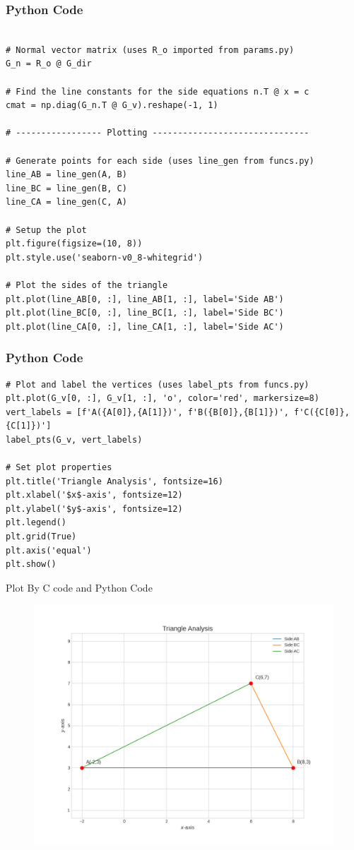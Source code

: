 \documentclass{beamer}
\begin{document}
\begin{frame}[fragile]
\frametitle{Python Code}
\begin{lstlisting}

# Normal vector matrix (uses R_o imported from params.py)
G_n = R_o @ G_dir

# Find the line constants for the side equations n.T @ x = c
cmat = np.diag(G_n.T @ G_v).reshape(-1, 1)

# ----------------- Plotting -------------------------------

# Generate points for each side (uses line_gen from funcs.py)
line_AB = line_gen(A, B)
line_BC = line_gen(B, C)
line_CA = line_gen(C, A)

# Setup the plot
plt.figure(figsize=(10, 8))
plt.style.use('seaborn-v0_8-whitegrid')

# Plot the sides of the triangle
plt.plot(line_AB[0, :], line_AB[1, :], label='Side AB')
plt.plot(line_BC[0, :], line_BC[1, :], label='Side BC')
plt.plot(line_CA[0, :], line_CA[1, :], label='Side AC')
\end{lstlisting}
\end{frame}  

\begin{frame}[fragile]
\frametitle{Python Code}
\begin{lstlisting}
# Plot and label the vertices (uses label_pts from funcs.py)
plt.plot(G_v[0, :], G_v[1, :], 'o', color='red', markersize=8)
vert_labels = [f'A({A[0]},{A[1]})', f'B({B[0]},{B[1]})', f'C({C[0]},{C[1]})']
label_pts(G_v, vert_labels)

# Set plot properties
plt.title('Triangle Analysis', fontsize=16)
plt.xlabel('$x$-axis', fontsize=12)
plt.ylabel('$y$-axis', fontsize=12)
plt.legend()
plt.grid(True)
plt.axis('equal')
plt.show()
\end{lstlisting}
\end{frame}   
\begin{frame}{Plot By C code and Python Code}
    \begin{figure}
    \centering
    \includegraphics[width=0.7\columnwidth]{figs/Figure_1.png}
    \label{fig:placeholder}
\end{figure}
\end{frame}
\end{document}

